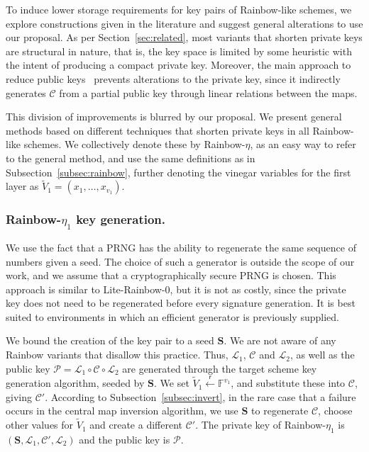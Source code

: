 \documentclass[draft, 12pt, a4paper, oneside]{memoir}
\newcommand{\random}{\overset{\mathsf{r}}{\gets}}
\theoremstyle{definition}
\begin{document}
To induce lower storage requirements for key pairs of Rainbow-like schemes, we
explore constructions given in the literature and suggest general alterations
to use our proposal. As per Section~\ref{sec:related}, most variants that
shorten private keys are structural in nature, that is, the key space is
limited by some heuristic with the intent of producing a compact private key.
Moreover, the main approach to reduce public keys~\cite{Petzoldt:201307}
prevents alterations to the private key,
since it indirectly generates $\mathcal{C}$ from a partial public key through
linear relations between the maps.

This division of improvements is blurred by our proposal. We present general
methods based on different techniques that shorten private keys in all
Rainbow-like schemes. We collectively denote these by Rainbow-$\eta$, as an easy way to refer to the general method, and use
the same definitions as in Subsection~\ref{subsec:rainbow}, further denoting
the vinegar variables for the first layer as
$\widetilde{V}_{1} = (x_{1}, \dots, x_{v_{1}})$.

\subsubsection{Rainbow-$\eta_{1}$ key generation.}

We use the fact that a PRNG has the ability to regenerate the same sequence of
numbers given a seed. The choice of such a generator is outside the scope of
our work, and we assume that a cryptographically secure PRNG is chosen. This
approach is similar to Lite-Rainbow-0, but it is not as costly, since the
private key does not need to be regenerated before every signature generation.
It is best suited to environments in which an efficient generator is previously
supplied.

We bound the creation of the key pair to a seed $\mathbf{S}$. We are not aware
of any Rainbow variants that disallow this practice. Thus, $\mathcal{L}_{1}$,
$\mathcal{C}$ and $\mathcal{L}_{2}$, as well as the public key
$\mathcal{P} = \mathcal{L}_{1} \circ \mathcal{C} \circ \mathcal{L}_{2}$ are generated
through the target scheme key generation algorithm, seeded by $\mathbf{S}$. We
set $\widetilde{V}_{1} \random \mathbb{F}^{v_{1}}$, and substitute these into
$\mathcal{C}$, giving $\mathcal{C}'$. According to
Subsection~\ref{subsec:invert}, in the rare case that a
failure occurs in the central map inversion algorithm, we use $\mathbf{S}$ to
regenerate $\mathcal{C}$, choose other values for $\widetilde{V}_{1}$ and
create a different $\mathcal{C}'$. The private key of Rainbow-$\eta_{1}$ is
$(\mathbf{S}, \mathcal{L}_{1}, \mathcal{C}', \mathcal{L}_{2})$ and the public key is
$\mathcal{P}$.
\end{document}
